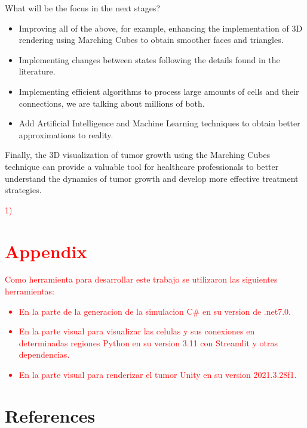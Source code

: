 \documentclass[a4paper,11pt]{article}
\begin{document}
{What will be the focus in the next stages? 
\begin{itemize}
    \item Improving all of the above, for example, enhancing the implementation of 3D rendering using Marching Cubes to obtain smoother faces and triangles.
    \item Implementing changes between states following the details found in the literature.
    \item Implementing efficient algorithms to process large amounts of cells and their connections, we are talking about millions of both.
    \item Add Artificial Intelligence and Machine Learning techniques to obtain better approximations to reality.
\end{itemize}

Finally, the 3D visualization of tumor growth using the Marching Cubes technique can provide a valuable tool for healthcare professionals to better understand the dynamics of tumor growth and develop more effective treatment strategies.

\textcolor{red}{1)}
\section*{\textcolor{red}{Appendix}}

\textcolor{red}{Como herramienta para desarrollar este trabajo se utilizaron las siguientes herramientas:
\begin{itemize}
    \item En la parte de la generacion de la simulacion C# en su version de .net7.0.
    \item En la parte visual para visualizar las celulas y sus conexiones en determinadas regiones Python en su version 3.11 con Streamlit y otras dependencias.
    \item En la parte visual para renderizar el tumor Unity en su version 2021.3.28f1.
\end{itemize}
}


\section*{References}
\label{Nada}
\begin{flushleft}

\begin{thebibliography}{99}


\end{thebibliography}
\end{flushleft}}
\end{document}
